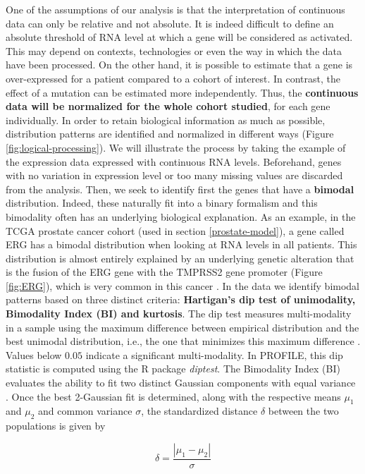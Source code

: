 \documentclass[a4paper,12pt,twoside,onecolumn,openright,final,oldfontcommands]{memoir}
\begin{document}
One of the assumptions of our analysis is that the interpretation of
continuous data can only be relative and not absolute. It is indeed
difficult to define an absolute threshold of RNA level at which a gene
will be considered as activated. This may depend on contexts,
technologies or even the way in which the data have been processed. On
the other hand, it is possible to estimate that a gene is over-expressed
for a patient compared to a cohort of interest. In contrast, the effect
of a mutation can be estimated more independently. Thus, the
\textbf{continuous data will be normalized for the whole cohort
studied}, for each gene individually. In order to retain biological
information as much as possible, distribution patterns are identified
and normalized in different ways (Figure \ref{fig:logical-processing}).
We will illustrate the process by taking the example of the expression
data expressed with continuous RNA levels. Beforehand, genes with no
variation in expression level or too many missing values are discarded
from the analysis. Then, we seek to identify first the genes that have a
\textbf{bimodal} distribution. Indeed, these naturally fit into a binary
formalism and this bimodality often has an underlying biological
explanation. As an example, in the TCGA prostate cancer cohort (used in
section \ref{prostate-model}), a gene called ERG has a bimodal
distribution when looking at RNA levels in all patients. This
distribution is almost entirely explained by an underlying genetic
alteration that is the fusion of the ERG gene with the TMPRSS2 gene
promoter (Figure \ref{fig:ERG}), which is very common in this cancer
\citep{tomlins2005recurrent}. In the data we identify bimodal patterns
based on three distinct criteria: \textbf{Hartigan's dip test of
unimodality, Bimodality Index (BI) and kurtosis}. The dip test measures
multi-modality in a sample using the maximum difference between
empirical distribution and the best unimodal distribution, i.e., the one
that minimizes this maximum difference \citep{hartigan1985dip}. Values
below \(0.05\) indicate a significant multi-modality. In PROFILE, this
dip statistic is computed using the R package \emph{diptest}. The
Bimodality Index (BI) evaluates the ability to fit two distinct Gaussian
components with equal variance \citep{wang2009bimodality}. Once the best
2-Gaussian fit is determined, along with the respective means \(\mu_1\)
and \(\mu_2\) and common variance \(\sigma\), the standardized distance
\(\delta\) between the two populations is given by

\[\delta = \dfrac{|\mu_1-\mu_2|}{\sigma}\]
\end{document}
